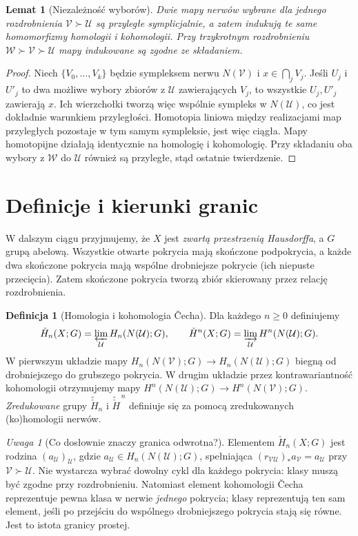 \documentclass[11pt,a4paper,oneside]{report}
\theoremstyle{plain}
\newtheorem{lemat}[twierdzenie]{Lemat}
\theoremstyle{definition}
\newtheorem{definicja}[twierdzenie]{Definicja}
\theoremstyle{remark}
\newtheorem{uwaga}[twierdzenie]{Uwaga}
\begin{document}
\begin{lemat}[Niezależność wyborów]
\label{lem:cech-contiguity-v4}
Dwie mapy nerwów wybrane dla jednego rozdrobnienia
$\mathcal V\succ\mathcal U$ są przyległe symplicjalnie,
a zatem indukują te same homomorfizmy homologii i kohomologii.
Przy trzykrotnym rozdrobnieniu $\mathcal W\succ\mathcal V\succ
\mathcal U$ mapy indukowane są zgodne ze składaniem.
\end{lemat}
\begin{proof}
Niech $\{V_0,\ldots,V_k\}$ będzie sympleksem nerwu
$N(\mathcal V)$ i $x\in\bigcap_j V_j$.
Jeśli $U_j$ i $U'_j$ to dwa możliwe wybory zbiorów z
$\mathcal U$ zawierających $V_j$, to wszystkie $U_j,U'_j$
zawierają $x$. Ich wierzchołki tworzą więc wspólnie sympleks
w $N(\mathcal U)$, co jest dokładnie warunkiem przyległości.
Homotopia liniowa między realizacjami map przyległych
pozostaje w tym samym sympleksie, jest więc ciągła.
Mapy homotopijne działają identycznie na homologię i kohomologię.
Przy składaniu oba wybory z $\mathcal W$ do $\mathcal U$
również są przyległe, stąd ostatnie twierdzenie.
\end{proof}

\section{Definicje i kierunki granic}
W dalszym ciągu przyjmujemy, że $X$ jest \emph{zwartą przestrzenią
Hausdorffa}, a $G$ grupą abelową. Wszystkie otwarte pokrycia
mają skończone podpokrycia, a każde dwa skończone pokrycia
mają wspólne drobniejsze pokrycie (ich niepuste przecięcia).
Zatem skończone pokrycia tworzą zbiór skierowany przez
relację rozdrobnienia.

\begin{definicja}[Homologia i kohomologia \v{C}echa]
Dla każdego $n\ge0$ definiujemy
\[
\check H_n(X;G)=\varprojlim_{\mathcal U} H_n(N(\mathcal U);G),
\qquad
\check H^n(X;G)=\varinjlim_{\mathcal U}H^n(N(\mathcal U);G).
\]
W pierwszym układzie mapy $H_n(N(\mathcal V);G)\to
H_n(N(\mathcal U);G)$ biegną od drobniejszego do grubszego
pokrycia. W drugim układzie przez kontrawariantność
kohomologii otrzymujemy mapy
$H^n(N(\mathcal U);G)\to H^n(N(\mathcal V);G)$.
\emph{Zredukowane} grupy $\widetilde{\check H}_n$ i
$\widetilde{\check H}^{\,n}$ definiuje się za pomocą
zredukowanych (ko)homologii nerwów.
\end{definicja}

\begin{uwaga}[Co dosłownie znaczy granica odwrotna?]
Elementem $\check H_n(X;G)$ jest rodzina
$(a_{\mathcal U})_{\mathcal U}$, gdzie
$a_{\mathcal U}\in H_n(N(\mathcal U);G)$, spełniająca
$(r_{\mathcal V\mathcal U})_*a_{\mathcal V}=a_{\mathcal U}$
przy $\mathcal V\succ\mathcal U$.
Nie wystarcza wybrać dowolny cykl dla każdego pokrycia:
klasy muszą być zgodne przy rozdrobnieniu.
Natomiast element kohomologii \v{C}echa reprezentuje pewna
klasa w nerwie \emph{jednego} pokrycia; klasy reprezentują
ten sam element, jeśli po przejściu do wspólnego drobniejszego
pokrycia stają się równe. Jest to istota granicy prostej.
\end{uwaga}
\end{document}
